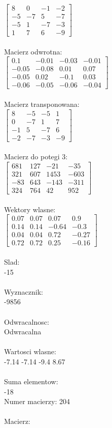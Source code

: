 \documentclass[a4paper,12pt]{article}
\begin{document}
$\begin{bmatrix} 8&0&-1&-2\\-5&-7&5&-7\\-5&1&-7&-3\\1&7&6&-9 \end{bmatrix}$
\\
\\
Macierz odwrotna:\\

$\begin{bmatrix} 0.1&-0.01&-0.03&-0.01\\-0.05&-0.08&0.01&0.07\\-0.05&0.02&-0.1&0.03\\-0.06&-0.05&-0.06&-0.04 \end{bmatrix}$
\\
\\
Macierz transponowana:\\

$\begin{bmatrix} 8&-5&-5&1\\0&-7&1&7\\-1&5&-7&6\\-2&-7&-3&-9 \end{bmatrix}$
\\
\\
Macierz do potegi 3:\\

$\begin{bmatrix} 681&127&-21&-35\\321&607&1453&-603\\-83&643&-143&-311\\324&764&42&952 \end{bmatrix}$
\\
\\
Wektory wlasne:\\

$\begin{bmatrix} 0.07&0.07&0.07&0.9\\0.14&0.14&-0.64&-0.3\\0.04&0.04&0.72&-0.27\\0.72&0.72&0.25&-0.16 \end{bmatrix}$
\\
\\
Slad:\\
-15
\\
\\
Wyznacznik:\\
-9856
\\
\\
Odwracalnosc:\\
Odwracalna
\\
\\
Wartosci wlasne:\\
-7.14 -7.14 -9.4 8.67
\\
\\
Suma elementow:\\
-18
\\
\newpage
Numer macierzy:
204
\\
\\
Macierz:\\
\end{document}
